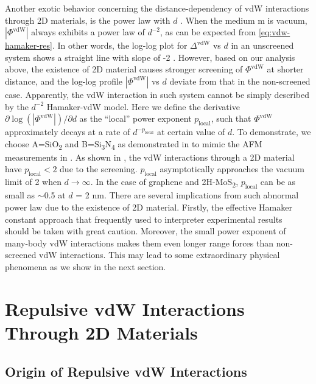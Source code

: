 Another exotic behavior concerning the distance-dependency of vdW
interactions through 2D materials, is the power law with $d$
.
%
When the medium m is vacuum, \(|\Phi^{\mathrm{vdW}}|\) always exhibits a
power law of \(d^{-2}\), as can be expected from
\autoref{eq:vdw-hamaker-res}.
%
In other words, the log-log plot for \(\Delta^{\mathrm{vdW}}\) vs
\(d\) in an unscreened system shows a straight line with slope of -2
.
%
However, based on our analysis above, the existence of 2D material
causes stronger screening of $\Phi^{\mathrm{vdW}}$ at shorter
distance, and the log-log profile \(|\Phi^{\mathrm{vdW}}|\) vs \(d\)
deviate from that in the non-screened case.
%
Apparently, the vdW interaction in such system cannot be simply
described by the $d^{-2}$ Hamaker-vdW model. Here we define the
derivative $\partial \log(|\Phi^{\mathrm{vdW}}|)/ \partial d$ as the
``local'' power exponent $p_{\mathrm{local}}$, such that
$\Phi^{\mathrm{vdW}}$ approximately decays at a rate of
$d^{-p_{\mathrm{local}}}$ at certain value of $d$.
%
To demonstrate, we choose A=SiO\textsubscript{2} and
B=Si\textsubscript{3}N\textsubscript{4} as demonstrated in
 to mimic the AFM measurements in
\textcite{Tsoi_2014_vdW_screening_2D}.
%
As shown in , the vdW interactions through a 2D material have $p_{\mathrm{local}} < 2$ due to the screening.
\(p_{\mathrm{local}}\) asymptotically approaches the vacuum limit of 2 when $d \to \infty$.
%
In the case of graphene and 2H-MoS\textsubscript{2},
\(p_{\mathrm{local}}\) can be as small as $\sim{}$0.5 at \(d\) = 2 nm.
There are several implications from such abnormal power law due to the
existence of 2D material. Firstly, the effective Hamaker constant
approach that frequently used to interpreter experimental
results~\cite{Tsoi_2014_vdW_screening_2D} should be
taken with great caution. Moreover, the small power exponent of
many-body vdW interactions makes them even longer range forces than
non-screened vdW interactions. This may lead to some extraordinary
physical phenomena as we show in the next section.

\section{Repulsive vdW Interactions Through 2D Materials}
\label{sec:vdw-repuls-vdw-inter}

\subsection{Origin of Repulsive vdW Interactions}
\label{sec:vdw-origin-repulsive-vdw}

